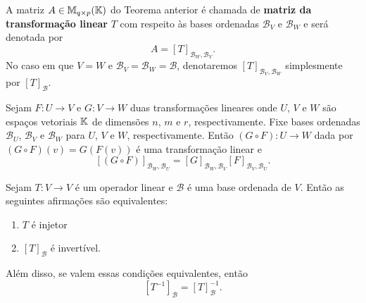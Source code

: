 \documentclass{beamer}
\begin{document}
\begin{frame}
    \begin{definicao}
        A matriz $A \in \mathbb{M}_{q\times p}(\mathbb{K})$ do Teorema anterior  é chamada de \textbf{matriz da transformação linear}  $T$ com respeito às bases ordenadas $\mathcal{B}_V$ e $\mathcal{B}_W$  e será denotada por
        \[
            A = [T]_{\mathcal{B}_{W},\mathcal{B}_{V}}.
        \]
        No caso em que $V = W$  e $\mathcal{B}_V = \mathcal{B}_W = \mathcal{B}$,  denotaremos $[T]_{\mathcal{B}_{V},\mathcal{B}_{W}}$  simplesmente por $[T]_\mathcal{B}$.
    \end{definicao}
\end{frame}

\begin{frame}
    \begin{teorema}\label{matriz_da_composicao_de_transformacoes}
        Sejam $F \colon U \to V$  e $G \colon V \to W$  duas transformações lineares onde $U$, $V$ e $W$  são espaços vetoriais $\mathbb{K}$  de dimensões $n$, $m$ e $r$, respectivamente.  Fixe bases ordenadas $\mathcal{B}_U$,  $\mathcal{B}_V$  e $\mathcal{B}_W$  para $U$, $V$ e $W$, respectivamente.  Então $(G \circ F) \colon U \to W$  dada por $(G\circ F)(v) = G(F(v))$  é uma transformação linear e
        \[
            [(G \circ F)]_{{\mathcal{B}_W},{\mathcal{B}_U}}  = [G]_{{\mathcal{B}_W},{\mathcal{B}_V}}[F]_{{\mathcal{B}_V},{\mathcal{B}_U}}.
        \]
    \end{teorema}
\end{frame}

\begin{frame}
    \begin{teorema}
        Sejam $T \colon V \to V$ é um operador linear  e $\mathcal{B}$ é uma base ordenada de $V$.  Então as seguintes afirmações são equivalentes:
        \begin{enumerate}[label={\roman*})]
            \item $T$ é injetor

            \vspace{1cm}

            \item $[T]_\mathcal{B}$ é invertível.
        \end{enumerate}

        \vspace{.2cm}

        Além disso, se valem essas condições equivalentes, então
        \[
            [T^{-1}]_\mathcal{B}  = [T]_\mathcal{B}^{-1}.
        \]
    \end{teorema}
\end{frame}
\end{document}
